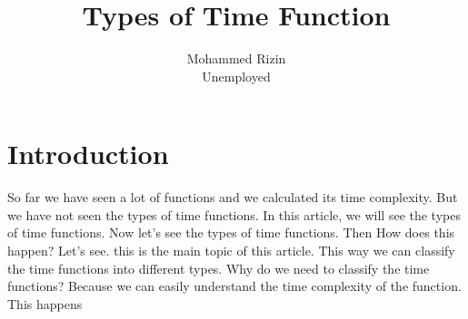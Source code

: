 \documentclass[twocolumn]{article}
\title{Types of Time Function}
\author{Mohammed Rizin \\ Unemployed}
\begin{document}
\maketitle

\section{Introduction}
So far we have seen a lot of functions and we calculated its time complexity. But we have not seen the types of time functions. In this article, we will see the types of time functions. 
Now let's see the types of time functions.
Then How does this happen? Let's see. this is the main topic of this article.
This way we can classify the time functions into different types. Why do we need to classify the time functions? Because we can easily understand the time complexity of the function.
This happens
\end{document}
